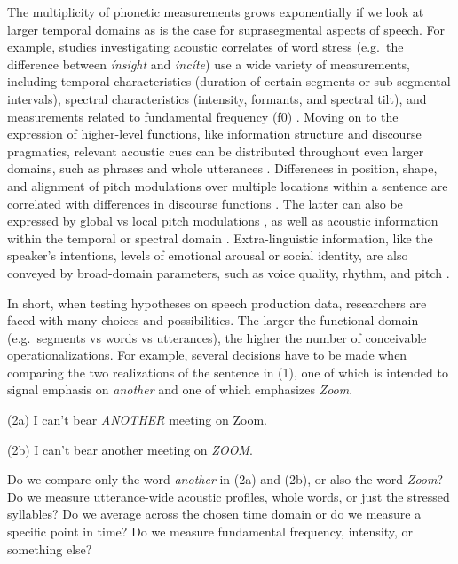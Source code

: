 \documentclass[Review,times,sageh]{sagej}
\begin{document}
The multiplicity of phonetic measurements grows exponentially if we look at larger temporal domains as is the case for suprasegmental aspects of speech.
For example, studies investigating acoustic correlates of word stress (e.g.~the difference between \emph{ínsight} and \emph{incíte}) use a wide variety of measurements, including temporal characteristics (duration of certain segments or sub-segmental intervals), spectral characteristics (intensity, formants, and spectral tilt), and measurements related to fundamental frequency (f0) \citep[e.g.,][]{gordon2017acoustic}.
Moving on to the expression of higher-level functions, like information structure and discourse pragmatics, relevant acoustic cues can be distributed throughout even larger domains, such as phrases and whole utterances \citep[e.g.,][]{ladd2008intonational}.
Differences in position, shape, and alignment of pitch modulations over multiple locations within a sentence are correlated with differences in discourse functions \citep[e.g.,][]{niebuhr2011}.
The latter can also be expressed by global vs local pitch modulations \citep{heuven2002}, as well as acoustic information within the temporal or spectral domain \citep[e.g.,][]{van2005speech}.
Extra-linguistic information, like the speaker's intentions, levels of emotional arousal or social identity, are also conveyed by broad-domain parameters, such as voice quality, rhythm, and pitch \citep{foulkes2006, ogden2004, white2009}.

In short, when testing hypotheses on speech production data, researchers are faced with many choices and possibilities.
The larger the functional domain (e.g.~segments vs words vs utterances), the higher the number of conceivable operationalizations.
For example, several decisions have to be made when comparing the two realizations of the sentence in (1), one of which is intended to signal emphasis on \emph{another} and one of which emphasizes \emph{Zoom}.

\vspace{1em}

(2a) I can't bear \emph{ANOTHER} meeting on Zoom.

(2b) I can't bear another meeting on \emph{ZOOM}.

\vspace{1em}

Do we compare only the word \emph{another} in (2a) and (2b), or also the word \emph{Zoom}?
Do we measure utterance-wide acoustic profiles, whole words, or just the stressed syllables?
Do we average across the chosen time domain or do we measure a specific point in time?
Do we measure fundamental frequency, intensity, or something else?
\end{document}
